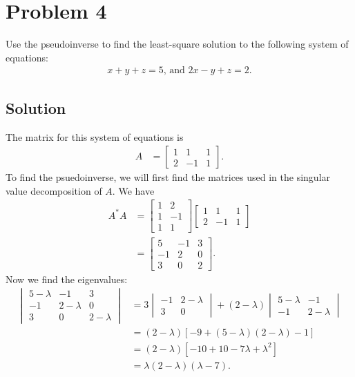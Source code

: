 \documentclass[10pt,a4paper]{article}
\theoremstyle{definition}
\begin{document}
\section*{Problem 4}
Use the pseudoinverse to find the least-square solution to the following system of equations:
\begin{align*}
x + y + z = 5 \text{, and } 2x - y + z = 2.
\end{align*}

\subsection*{Solution}
The matrix for this system of equations is
\begin{align*}
A &= \begin{bmatrix}
1 & 1 & 1\\
2 & -1 & 1
\end{bmatrix}.
\end{align*}
To find the psuedoinverse, we will first find the matrices used in the singular value decomposition of $A$. We have 
\begin{align*}
A^* A &= \begin{bmatrix}
1 & 2\\
1 & -1\\
1 & 1
\end{bmatrix} \begin{bmatrix}
1 & 1 & 1\\
2 & -1 & 1
\end{bmatrix}\\
&= \begin{bmatrix}
5 & -1 & 3\\
-1 & 2 & 0\\
3 & 0 & 2
\end{bmatrix}.
\end{align*}
Now we find the eigenvalues:
\begin{align*}
\begin{vmatrix}
5 - \lambda & -1 & 3\\
-1 & 2 - \lambda & 0\\
3 & 0 & 2 - \lambda
\end{vmatrix} &= 3 \begin{vmatrix}
-1 & 2 - \lambda\\
3 & 0
\end{vmatrix} + (2-\lambda) \begin{vmatrix}
5 - \lambda & -1\\
-1 & 2 - \lambda
\end{vmatrix}\\
&= (2- \lambda) [-9 + (5-\lambda)(2 - \lambda) - 1]\\
&= (2- \lambda)[-10 + 10 - 7\lambda + \lambda^2]\\
&= \lambda (2- \lambda)(\lambda - 7).
\end{align*}
\end{document}
